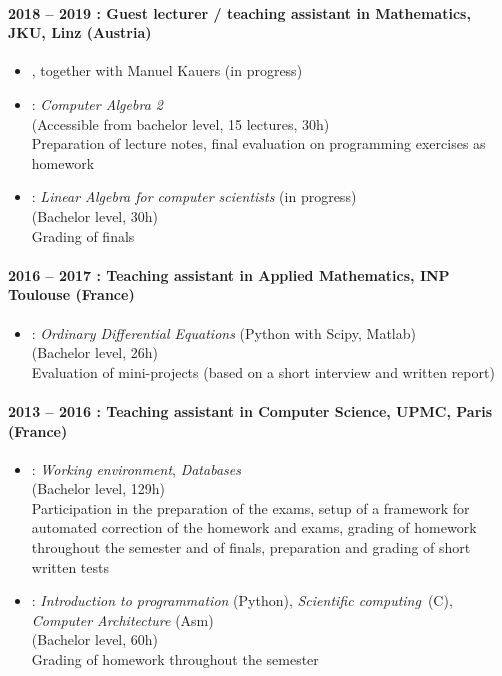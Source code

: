 \documentclass{scrartcl}
\begin{document}
\paragraph{2018 -- 2019 : Guest lecturer / teaching assistant in Mathematics, JKU, Linz (Austria)}
\begin{itemize}
  \item {}, together with Manuel Kauers (in progress)
  \item {}: \emph{Computer Algebra 2} \\
  (Accessible from bachelor level, 15 lectures, 30h)\\
  Preparation of lecture notes, final evaluation on programming exercises as homework
  \item {}: \emph{Linear Algebra for computer scientists} (in progress) \\
  (Bachelor level, 30h)\\
  Grading of finals
\end{itemize}
\paragraph{2016 -- 2017 : Teaching assistant in Applied Mathematics, INP Toulouse (France)}
\begin{itemize}
  \item {}: \emph{Ordinary Differential Equations} (Python with Scipy, Matlab)\\
  (Bachelor level, 26h)\\
  Evaluation of mini-projects (based on a short interview and written report)
\end{itemize}
\paragraph{2013 -- 2016 : Teaching assistant in Computer Science, UPMC, Paris (France)}
\begin{itemize}
  \item {}: \emph{Working environment}, \emph{Databases}\\
  (Bachelor level, 129h)\\
  Participation in the preparation of the exams, setup of a framework for automated correction of the homework and exams, grading of homework throughout the semester and of finals, preparation and grading of short written tests
  \item {}: \emph{Introduction to programmation} (Python), \emph{Scientific computing}~(C), \emph{Computer Architecture} (Asm) \\
  (Bachelor level, 60h)\\
  Grading of homework throughout the semester
\end{itemize}
\end{document}
